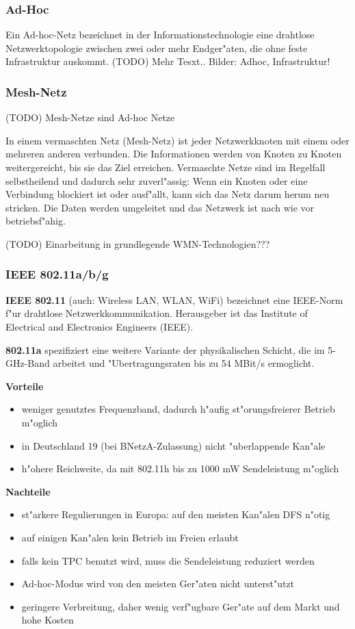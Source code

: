 \subsubsection{Ad-Hoc}

Ein Ad-hoc-Netz bezeichnet in der Informationstechnologie eine drahtlose
Netzwerktopologie zwischen zwei oder mehr Endger"aten, die ohne feste
Infrastruktur auskommt.
(TODO) Mehr Tesxt.. Bilder: Adhoc, Infrastruktur!


\subsubsection{Mesh-Netz}
(TODO) Mesh-Netze sind Ad-hoc Netze

In einem vermaschten Netz (Mesh-Netz) ist jeder Netzwerkknoten mit einem
oder mehreren anderen verbunden. Die Informationen werden von Knoten
zu Knoten weitergereicht, bis sie das Ziel erreichen. Vermaschte
Netze sind im Regelfall selbstheilend und dadurch sehr zuverl"assig:
Wenn ein Knoten oder eine Verbindung blockiert ist oder ausf"allt, kann
sich das Netz darum herum neu stricken. Die Daten werden umgeleitet und
das Netzwerk ist nach wie vor betriebsf"ahig. 

(TODO) Einarbeitung in grundlegende WMN-Technologien???


\subsubsection{IEEE 802.11a/b/g}

\textbf{IEEE 802.11} (auch: Wireless LAN, WLAN, WiFi) bezeichnet eine IEEE-Norm
f"ur drahtlose Netzwerkkommunikation. Herausgeber ist das Institute of
Electrical and Electronics Engineers (IEEE).

\textbf{802.11a} spezifiziert eine weitere Variante der physikalischen Schicht,
die im 5-GHz-Band arbeitet und "Ubertragungsraten bis zu 54 MBit/s
ermoglicht. 

\textbf{Vorteile }
\begin{itemize}
	\item weniger genutztes Frequenzband, dadurch h"aufig
	st"orungsfreierer Betrieb m"oglich 
	\item in Deutschland 19 (bei BNetzA-Zulassung) nicht "uberlappende
	Kan"ale 
	\item h"ohere Reichweite, da mit 802.11h bis zu 1000 mW Sendeleistung
	m"oglich 
\end{itemize}

\textbf{Nachteile }
\begin{itemize}
	\item st"arkere Regulierungen in Europa: auf den meisten Kan"alen DFS
	n"otig 
	\item auf einigen Kan"alen kein Betrieb im Freien erlaubt 
	\item falls kein TPC benutzt wird, muss die Sendeleistung reduziert
	werden 
	\item Ad-hoc-Modus wird von den meisten Ger"aten
		nicht unterst"utzt
	\item geringere Verbreitung, daher wenig verf"ugbare Ger"ate
		auf dem Markt und hohe Kosten
\end{itemize}

